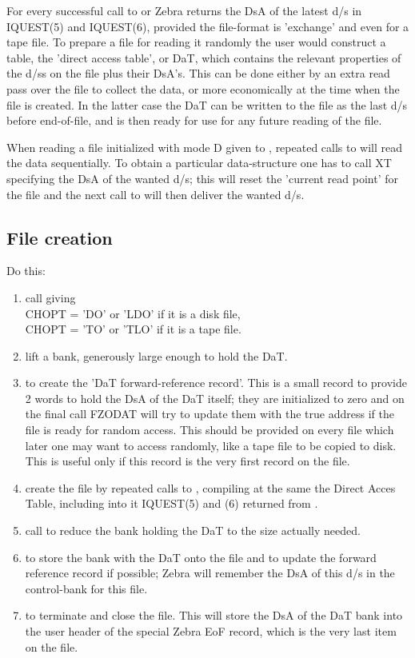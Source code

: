 {For every successful call to  or  Zebra returns the DsA
of the latest d/s in IQUEST(5) and IQUEST(6),
provided the file-format is 'exchange' and even for a tape file.
To prepare a file for reading it randomly the user would construct
a table, the 'direct access table', or DaT, which contains the
relevant properties of the d/ss on the file plus their DsA's.
This can be done either by an extra read pass over the file
to collect the data, or more economically at the time when the
file is created.
In the latter case the DaT can be written to the file as
the last d/s before end-of-file,
and is then ready for use for any future reading of the file.

When reading a file initialized with mode D given to ,
repeated calls to  will read the data sequentially.
To obtain a particular data-structure one has to call XT specifying
the DsA of the wanted d/s; this will reset the 'current read point'
for the file and the next call to  will then deliver the wanted d/s.

\subsection*{File creation}

Do this:
\begin{enumerate}
\item call  giving\\
      \hspace*{35mm} CHOPT = 'DO' or 'LDO' if it is a disk file,\\
      \hspace*{35mm} CHOPT = 'TO' or 'TLO' if it is a tape file.
\item lift a bank, generously large enough to hold the DaT.
\item {}  to create the
 'DaT forward-reference record'.
This is a small record to provide 2 words to hold the DsA of the DaT
itself; they are initialized to zero and on the final call FZODAT will
try to update them with the true address if the file is ready for
random access.
This should be provided on every file which later one may want
to access randomly, like a tape file to be copied to disk.
This is useful only if this record is the very first record on the file.
\item create the file by repeated calls to ,
compiling at the same the Direct Acces Table,
including into it IQUEST(5) and (6) returned from .
\item call  to reduce the bank holding the DaT to the size
actually needed.
\item {}  to store the bank with the DaT
onto the file and to update the forward reference record if possible;
Zebra will remember the DsA of this d/s in the control-bank for this file.
\item {}  to terminate and close the file.
This will store the DsA of the DaT bank into the user header of
the special Zebra EoF record, which is the very last item on the file.
\end{enumerate}

}
